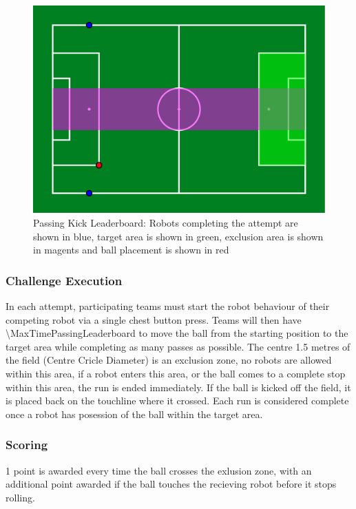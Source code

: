 \begin{figure}[t]
    \centerline{\includegraphics[width=\columnwidth]{figs/passing_leaderboard.pdf}}
    \caption{Passing Kick Leaderboard: Robots completing the attempt are shown in blue, target area is shown in green, exclusion area is shown in magents and ball placement is shown in red}
    \label{fig:passing_leaderboard}
\end{figure}
\subsubsection{Challenge Execution}
In each attempt, participating teams must start the robot behaviour of their competing robot via a single chest button
press. Teams will then have \qty{\MaxTimePassingLeaderboard}{\sec} to move the ball from the starting
position to the target area while completing as many passes as possible. The centre
1.5 metres of the field (Centre Cricle Diameter) is an exclusion zone, no robots are allowed within this area,
if a robot enters this area, or the ball comes to a complete stop
within this area, the run is ended immediately. If the ball is kicked off the field,
it is placed back on the touchline where it crossed. Each run is considered complete
once a robot has posession of the ball within the target area.

\subsubsection{Scoring}
1 point is awarded every time the ball crosses the exlusion zone, with an additional point
awarded if the ball touches the recieving robot before it stops rolling.

